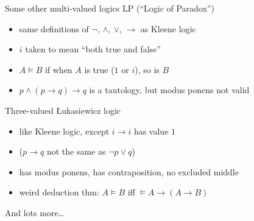 \documentclass{beamer}
\begin{document}
\begin{frame}{Some other multi-valued logics}
LP (``Logic of Paradox'')
\begin{itemize}
\item same definitions of $\lnot$, $\land$, $\lor$, $\to$ as Kleene logic
\item $i$ taken to mean ``both true and false''
\item $A\vDash B$ if when $A$ is true ($1$ or $i$), so is $B$
\item $p\land (p\to q)\to q$ is a tautology, but modus ponens not valid
\end{itemize}

\vfill

Three-valued \L ukasiewicz logic
\begin{itemize}
\item like Kleene logic, except $i\to i$ has value $1$
\item ($p\to q$ not the same as $\lnot p\lor q$)
\item has modus ponens, has contraposition, no excluded middle
\item weird deduction thm: $A\vDash B$ iff $\vDash A\to(A\to B)$
\end{itemize}

\vfill

And lots more\dots

\vfill

\end{frame}
\end{document}
